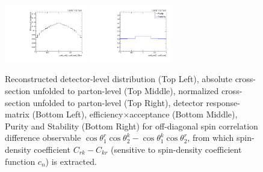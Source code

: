 \begin{figure}[htb]
\begin{center}
 \includegraphics[width=0.32\textwidth]{fig_fullRun2UL/unfolding/combined/TotEff_c_Mrk.pdf}
 \includegraphics[width=0.32\textwidth]{fig_fullRun2UL/unfolding/combined/PurStab_c_Mrk.pdf} \\
\caption{Reconstructed detector-level distribution (Top Left), absolute cross-section unfolded to parton-level (Top Middle), normalized cross-section unfolded to parton-level (Top Right), detector response-matrix (Bottom Left), efficiency$\times$acceptance (Bottom Middle), Purity and Stability (Bottom Right) for off-diagonal spin correlation difference observable $\cos\theta_{1}^{r}\cos\theta_{2}^{k}-\cos\theta_{1}^{k}\cos\theta_{2}^{r}$, from which spin-density coefficient $C_{rk}-C_{kr}$ (sensitive to spin-density coefficient function $c_n$) is extracted.}
\label{fig:c_Mrk}
\end{center}
\end{figure}
\clearpage
